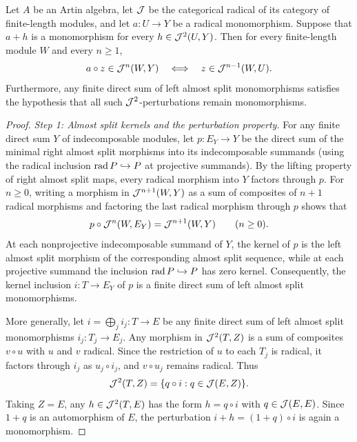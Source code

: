 \begin{lemma}
\label{lem:strict-radical-layers}
Let $A$ be an Artin algebra, let $\mathcal J$ be the categorical radical of its
category of finite-length modules, and let $a:U\to Y$ be a radical
monomorphism. Suppose that $a+h$ is a monomorphism for every
$h\in \mathcal J^2(U,Y)$. Then for every finite-length module $W$ and every
$n\geq1$,
\[
             a\circ z\in \mathcal J^n(W,Y)\quad\Longleftrightarrow\quad
             z\in \mathcal J^{n-1}(W,U).
\]
Furthermore, any finite direct sum of left almost split monomorphisms
satisfies the hypothesis that all such $\mathcal J^2$-perturbations remain
monomorphisms.
\end{lemma}
\begin{proof}
\emph{Step 1: Almost split kernels and the perturbation property.}
For any finite direct sum $Y$ of indecomposable modules, let $p:E_Y\to Y$ be
the direct sum of the minimal right almost split morphisms into its
indecomposable summands (using the radical inclusion $\operatorname{rad} P\hookrightarrow P$
at projective summands). By the lifting property of right almost split maps,
every radical morphism into $Y$ factors through $p$. For $n\geq0$, writing a
morphism in $\mathcal J^{n+1}(W,Y)$ as a sum of composites of $n+1$ radical morphisms
and factoring the last radical morphism through $p$ shows that
\begin{equation}
 p\circ \mathcal J^n(W,E_Y)=\mathcal J^{n+1}(W,Y)\qquad(n\geq0).
 \label{eq:right-radical-surjection}
\end{equation}
At each nonprojective indecomposable summand of $Y$, the kernel of $p$ is
the left almost split morphism of the corresponding almost split sequence,
while at each projective summand the inclusion $\operatorname{rad} P\hookrightarrow P$ has
zero kernel. Consequently, the kernel inclusion $i:T\to E_Y$ of $p$ is a
finite direct sum of left almost split monomorphisms.

More generally, let $i=\bigoplus_j i_j:T\to E$ be any finite direct sum of
left almost split monomorphisms $i_j:T_j\to E_j$. Any morphism in
$\mathcal J^2(T,Z)$ is a sum of composites $v\circ u$ with $u$ and $v$ radical. Since
the restriction of $u$ to each $T_j$ is radical, it factors through $i_j$ as
$u_j\circ i_j$, and $v\circ u_j$ remains radical. Thus
\[
 \mathcal J^2(T,Z)=\{q\circ i:q\in \mathcal J(E,Z)\}.
\]
Taking $Z=E$, any $h\in \mathcal J^2(T,E)$ has the form $h=q\circ i$ with
$q\in \mathcal J(E,E)$. Since $1+q$ is an automorphism of $E$, the perturbation
$i+h=(1+q)\circ i$ is again a monomorphism.


\end{proof}
